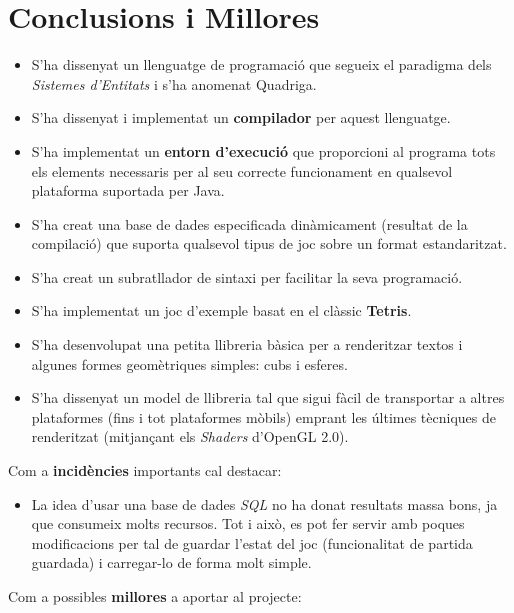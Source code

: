 \chapter{Conclusions i Millores}
\label{chap:Conclusions}


\begin{itemize}
  \item S'ha dissenyat un llenguatge de programació que segueix el paradigma dels {\em Sistemes d'Entitats} i s'ha anomenat Quadriga.
  \item S'ha dissenyat i implementat un {\bf compilador} per aquest llenguatge.
  \item S'ha implementat un {\bf entorn d'execució} que proporcioni al programa tots els elements necessaris per al seu correcte funcionament en qualsevol plataforma suportada per Java.
  \item S'ha creat una base de dades especificada dinàmicament (resultat de la compilació) que suporta qualsevol tipus de joc sobre un format estandaritzat.
  \item S'ha creat un subratllador de sintaxi per facilitar la seva programació.
  \item S'ha implementat un joc d'exemple basat en el clàssic {\bf Tetris}.
  \item S'ha desenvolupat una petita llibreria bàsica per a renderitzar textos i algunes formes geomètriques simples: cubs i esferes.
  \item S'ha dissenyat un model de llibreria tal que sigui fàcil de transportar a altres plataformes (fins i tot plataformes mòbils) emprant les últimes tècniques de renderitzat (mitjançant els {\em Shaders} d'OpenGL 2.0).
\end{itemize}

Com a {\bf incidències} importants cal destacar:

\begin{itemize}
  \item La idea d'usar una base de dades {\em SQL} no ha donat resultats massa bons, ja que consumeix molts recursos. Tot i això, es pot fer servir amb poques modificacions per tal de guardar l'estat del joc (funcionalitat de partida guardada) i carregar-lo de forma molt simple.
\end{itemize}

Com a possibles {\bf millores} a aportar al projecte:

